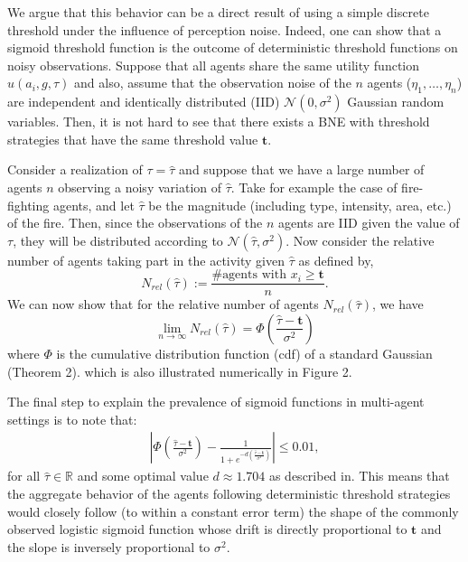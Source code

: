 \documentclass[12pt]{article}
\def\R{\mathbb{R}}    %
\def\td{\mathbf{t}}   %
\begin{document}
We argue that this behavior can be a direct result of using a simple discrete threshold under the influence of perception noise. Indeed, one can show that a sigmoid threshold function is the outcome of deterministic threshold functions on noisy observations. Suppose that all  agents share the same utility function $u(a_i,g,\tau)$ and also, assume that the observation noise of the $n$ agents ($\eta_1,\ldots,\eta_n$) are independent and identically distributed (IID) $\mathcal{N}(0,\sigma^2)$ Gaussian random variables. Then, it is not hard to see that there exists a BNE with threshold strategies that have the same threshold value $\td$\cite{Morris2000}.

Consider a realization of $\tau=\hat{\tau}$ and suppose that we have a large number of agents $n$ observing a noisy variation of $\hat{\tau}$. Take for example the case of fire-fighting agents, and let $\hat{\tau}$ be the magnitude (including type, intensity, area, etc.) of the fire. Then, since the observations of the $n$ agents are IID given the value of $\tau$, they will be distributed according to $\mathcal{N}(\hat{\tau},\sigma^2)$. Now consider the relative number of agents taking part in the activity given $\hat{\tau}$ as defined by, 
\begin{equation*}
	N_{rel}(\hat{\tau}):=\frac{\#\text{agents with }x_i\geq \td}{n}.
\end{equation*}
We can now show that for the relative number of agents $N_{rel}(\hat{\tau})$, we have
\begin{equation}
\lim_{n\to\infty}N_{rel}(\hat{\tau})=\Phi(\frac{\hat{\tau}-\td}{\sigma^2})
\end{equation}
where $\Phi$ is the cumulative distribution function (cdf) of a standard Gaussian (Theorem 2). which is also illustrated numerically in Figure 2. 


The final step to explain the prevalence of sigmoid functions in multi-agent settings is to note that:
\begin{align*}
|\Phi(\frac{\hat{\tau}-\td}{\sigma^2})-\frac{1}{1+e^{-d(\frac{\hat{\tau}-\td}{\sigma^2})}}|\leq 0.01,
\end{align*}
for all $\hat{\tau}\in\R$ and some optimal value $d\approx 1.704$ as described in\cite{Camilli1994}. This means that the aggregate behavior of the agents following deterministic threshold strategies would closely follow (to within a constant error term) the shape of the commonly observed logistic sigmoid function whose drift is directly proportional to $\td$ and the slope is inversely proportional to $\sigma^2$. 
\end{document}
